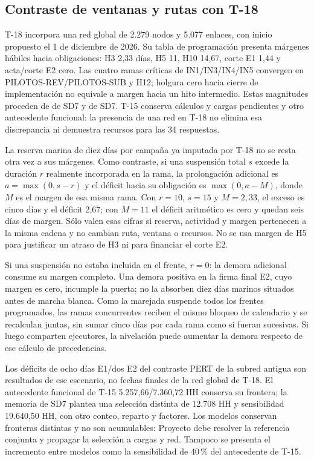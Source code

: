 \subsection{Contraste de ventanas y rutas con T-18}\label{sec:sd8-contraste-ventanas}
T-18 incorpora una red global de 2.279 nodos y 5.077 enlaces, con inicio propuesto el 1 de diciembre de 2026. Su tabla de programación presenta márgenes hábiles hacia obligaciones: H3 2,33 días, H5 11, H10 14,67, corte E1 1,44 y acta/corte E2 cero. Las cuatro ramas críticas de IN1/IN3/IN4/IN5 convergen en PILOTOS-REV/PILOTOS-SUB y H12; holgura cero hacia cierre de implementación no equivale a margen hacia un hito intermedio. Estas magnitudes proceden de  de SD7 y  de SD7. T-15 conserva cálculos y cargas pendientes y otro antecedente funcional: la presencia de una red en T-18 no elimina esa discrepancia ni demuestra recursos para las 34 respuestas.

La reserva marina de diez días por campaña ya imputada por T-18 no se resta otra vez a sus márgenes. Como contraste, si una suspensión total $s$ excede la duración $r$ realmente incorporada en la rama, la prolongación adicional es $a=\max(0,s-r)$ y el déficit hacia su obligación es $\max(0,a-M)$, donde $M$ es el margen de esa misma rama. Con $r=10$, $s=15$ y $M=2{,}33$, el exceso es cinco días y el déficit 2,67; con $M=11$ el déficit aritmético es cero y quedan seis días de margen. Sólo valen esas cifras si reserva, actividad y margen pertenecen a la misma cadena y no cambian ruta, ventana o recursos. No se usa margen de H5 para justificar un atraso de H3 ni para financiar el corte E2.

Si una suspensión no estaba incluida en el frente, $r=0$: la demora adicional consume su margen completo. Una demora positiva en la firma final E2, cuyo margen es cero, incumple la puerta; no la absorben diez días marinos situados antes de marcha blanca. Como la marejada suspende todos los frentes programados, las ramas concurrentes reciben el mismo bloqueo de calendario y se recalculan juntas, sin sumar cinco días por cada rama como si fueran sucesivas. Si luego comparten ejecutores, la nivelación puede aumentar la demora respecto de ese cálculo de precedencias.

Los déficits de ocho días E1/dos E2 del contraste PERT de la subred antigua son resultados de ese escenario, no fechas finales de la red global de T-18. El antecedente funcional de T-15 5.257,66/7.360,72 HH conserva su frontera; la memoria  de SD7 plantea una selección distinta de 12.708 HH y sensibilidad 19.640,50 HH, con otro conteo, reparto y factores. Los modelos conservan fronteras distintas y no son acumulables: Proyecto debe resolver la referencia conjunta y propagar la selección a cargas y red. Tampoco se presenta el incremento entre modelos como la sensibilidad de 40\,\% del antecedente de T-15.

